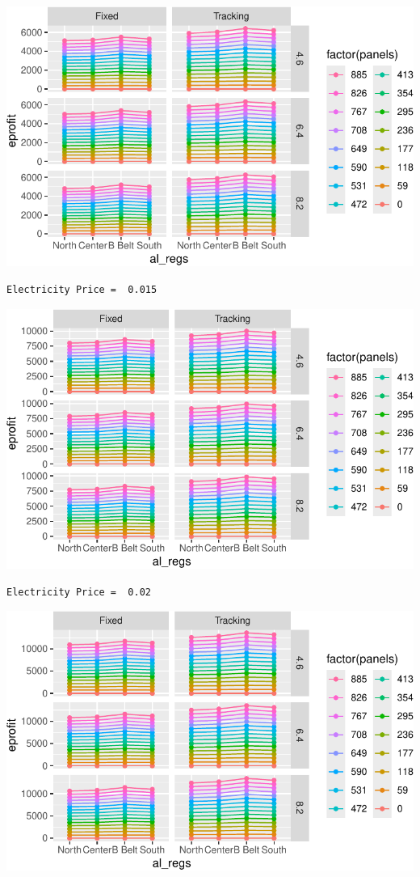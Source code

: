 \documentclass[
  letterpaper,
  DIV=11,
  numbers=noendperiod]{scrartcl}
\begin{document}
\includegraphics{Simulation_files/figure-pdf/unnamed-chunk-25-1.pdf}

\begin{verbatim}
Electricity Price =  0.015
\end{verbatim}

\includegraphics{Simulation_files/figure-pdf/unnamed-chunk-25-2.pdf}

\begin{verbatim}
Electricity Price =  0.02
\end{verbatim}

\includegraphics{Simulation_files/figure-pdf/unnamed-chunk-25-3.pdf}
\end{document}
